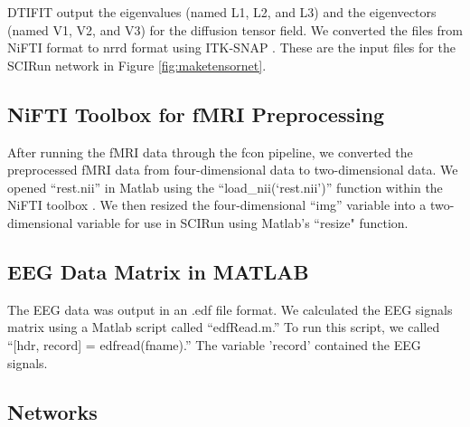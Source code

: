 DTIFIT output the eigenvalues (named L1, L2, and L3) and the eigenvectors (named V1, V2, and V3) for the diffusion tensor field. We converted the files from NiFTI format to nrrd format using ITK-SNAP \cite{ref:itksnap}. These are the input files for the SCIRun network in Figure \ref{fig:maketensornet}.

\subsection{NiFTI Toolbox for fMRI Preprocessing}
\label{sec:nifti}

After running the fMRI data through the fcon pipeline, we converted the preprocessed fMRI data from four-dimensional data to two-dimensional data. We opened ``rest.nii'' in Matlab using the ``load\_nii(`rest.nii')'' function within the NiFTI toolbox \cite{ref:nifti}. We then resized the four-dimensional ``img'' variable into a two-dimensional variable for use in SCIRun using Matlab's ``resize" function.

\subsection{EEG Data Matrix in MATLAB}
\label{ref:eegmatlab}

The EEG data was output in an .edf file format. We calculated the EEG signals matrix using a Matlab script called ``edfRead.m.'' \cite{ref:edfread} To run this script, we called ``[hdr, record] = edfread(fname).'' The variable 'record' contained the EEG signals. 

\subsection{Networks}
\label{sec:networks}

